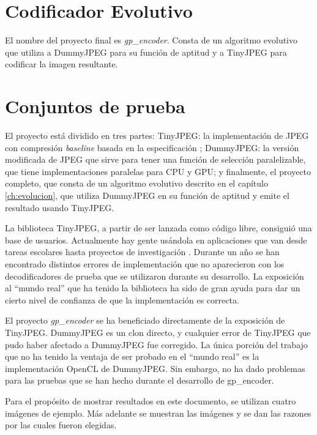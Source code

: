 \section{Codificador Evolutivo}

El nombre del proyecto final es \emph{gp\_encoder}. Consta de un algoritmo
evolutivo que utiliza a DummyJPEG para su función de aptitud y a TinyJPEG
para codificar la imagen resultante.

\section{Conjuntos de prueba} \label{sec:testset}

El proyecto está dividido en tres partes: TinyJPEG: la implementación de JPEG
con compresión \emph{baseline} basada en la especificación \cite{jpeg-spec};
DummyJPEG: la versión modificada de JPEG que sirve para tener una función de
selección paralelizable, que tiene implementaciones paralelas para CPU y GPU; y
finalmente, el proyecto completo, que consta de un algoritmo evolutivo descrito
en el capítulo \ref{ch:evolucion}, que utiliza DummyJPEG en su función de
aptitud y emite el resultado usando TinyJPEG.

La biblioteca TinyJPEG, a partir de ser lanzada como código libre, consiguió
una base de usuarios. Actualmente hay gente usándola en aplicaciones que van
desde tareas escolares hasta proyectos de investigación \cite{humblebrag}.
Durante un año se han encontrado distintos errores de implementación que no
aparecieron con los decodificadores de prueba que se utilizaron durante su
desarrollo. La exposición al ``mundo real'' que ha tenido la biblioteca ha sido
de gran ayuda para dar un cierto nivel de confianza de que la implementación es
correcta.

El proyecto \emph{gp\_encoder} se ha beneficiado directamente de la exposición
de TinyJPEG. DummyJPEG es un clon directo, y cualquier error de TinyJPEG que
pudo haber afectado a DummyJPEG fue corregido. La única porción del trabajo que
no ha tenido la ventaja de ser probado en el ``mundo real'' es la implementación
OpenCL de DummyJPEG. Sin embargo, no ha dado problemas para las pruebas que se
han hecho durante el desarrollo de gp\_encoder.

Para el propósito de mostrar resultados en este documento, se utilizan cuatro
imágenes de ejemplo. Más adelante se muestran las imágenes y se dan las razones
por las cuales fueron elegidas.

